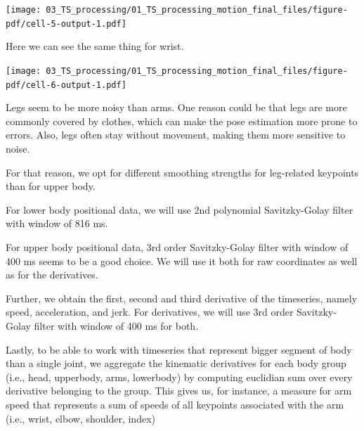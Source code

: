 \documentclass[
  letterpaper,
  DIV=11,
  numbers=noendperiod]{scrreprt}
\begin{document}
\texttt{[image: 03\_TS\_processing/01\_TS\_processing\_motion\_final\_files/figure-pdf/cell-5-output-1.pdf]}

Here we can see the same thing for wrist.

\texttt{[image: 03\_TS\_processing/01\_TS\_processing\_motion\_final\_files/figure-pdf/cell-6-output-1.pdf]}

Legs seem to be more noisy than arms. One reason could be that legs are
more commonly covered by clothes, which can make the pose estimation
more prone to errors. Also, legs often stay without movement, making
them more sensitive to noise.

For that reason, we opt for different smoothing strengths for
leg-related keypoints than for upper body.

For lower body positional data, we will use 2nd polynomial
Savitzky-Golay filter with window of 816 ms.

For upper body positional data, 3rd order Savitzky-Golay filter with
window of 400 ms seems to be a good choice. We will use it both for raw
coordinates as well as for the derivatives.

Further, we obtain the first, second and third derivative of the
timeseries, namely speed, acceleration, and jerk. For derivatives, we
will use 3rd order Savitzky-Golay filter with window of 400 ms for both.

Lastly, to be able to work with timeseries that represent bigger segment
of body than a single joint, we aggregate the kinematic derivatives for
each body group (i.e., head, upperbody, arms, lowerbody) by computing
euclidian sum over every derivative belonging to the group. This gives
us, for instance, a measure for arm speed that represents a sum of
speeds of all keypoints associated with the arm (i.e., wrist, elbow,
shoulder, index)
\end{document}
